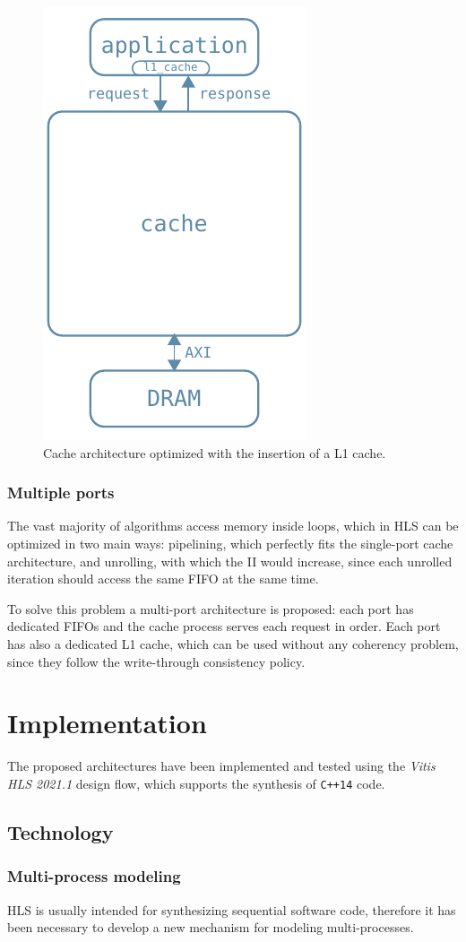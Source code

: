 \documentclass[11pt,a4paper]{memoir}
\begin{document}
\begin{figure}
	\centering
	\includegraphics[width=.3\textwidth]{l1_arch}
	\caption{Cache architecture optimized with the insertion of a L1 cache.}
	\label{fig:l1_arch}
\end{figure}

\subsection{Multiple ports}
The vast majority of algorithms access memory inside loops, which in HLS can be
optimized in two main ways: pipelining, which perfectly fits the single-port
cache architecture, and unrolling, with which the II would increase, since each
unrolled iteration should access the same FIFO at the same time.

To solve this problem a multi-port architecture is proposed: each port has
dedicated FIFOs and the cache process serves each request in order.
Each port has also a dedicated L1 cache, which can be used without any
coherency problem, since they follow the write-through consistency policy.

\chapter{Implementation}
The proposed architectures have been implemented and tested using the
\emph{Vitis HLS 2021.1} design flow, which supports the synthesis of
\texttt{C++14} code.
\section{Technology}
\subsection{Multi-process modeling}
HLS is usually intended for synthesizing sequential software code, therefore it
has been necessary to develop a new mechanism for modeling multi-processes.
\end{document}
